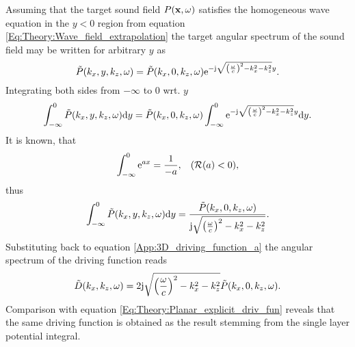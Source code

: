 Assuming that the target sound field $P(\mathbf{x},\omega)$ satisfies the homogeneous wave equation in the $y<0$ region from equation
\eqref{Eq:Theory:Wave_field_extrapolation} the target angular spectrum of the sound field may be written for arbitrary $y$ as
\begin{equation}
\tilde{P}(k_x,y,k_z,\omega) = \tilde{P}(k_x,0,k_z,\omega)\mathrm{e}^{-\mathrm{j} \sqrt{ \left( \frac{\omega}{c} \right)^2 - k_x^2 - k_z^2 } y }.
\end{equation}
Integrating both sides from $-\infty$ to $0$ wrt. $y$ 
\begin{equation}
\int_{-\infty}^{0} \tilde{P}(k_x,y,k_z,\omega) \mathrm{d} y = \tilde{P}(k_x,0,k_z,\omega) \int_{-\infty}^{0} \mathrm{e}^{-\mathrm{j} \sqrt{ \left( \frac{\omega}{c} \right)^2 - k_x^2 - k_z^2 } y } \mathrm{d} y.
\end{equation}
It is known, that
\begin{equation}
\int_{-\infty}^{0}\mathrm{e}^{a x} = \frac{1}{-a}, \hspace{3mm} (\mathcal{R}(a)<0),
\end{equation}
thus
\begin{equation}
\int_{-\infty}^{0} \tilde{P}(k_x,y,k_z,\omega) \mathrm{d} y = 
\frac{\tilde{P}(k_x,0,k_z,\omega) }{\mathrm{j} \sqrt{ \left( \frac{\omega}{c} \right)^2 - k_x^2 - k_z^2 } }.
\end{equation}
Substituting back to equation \eqref{App:3D_driving_function_a} the angular spectrum of the driving function reads
\begin{equation}
\tilde{D}(k_x,k_z,\omega)
=  2 \mathrm{j} \sqrt{ \left( \frac{\omega}{c}  \right)^2 - k_x^2 - k_z^2 }
\tilde{P}(k_x,0,k_z,\omega) .
\label{App:3D_driving_function}
\end{equation}
Comparison with equation \eqref{Eq:Theory:Planar_explicit_driv_fun} reveals that the same driving function is obtained as the result stemming from the single layer potential integral.

